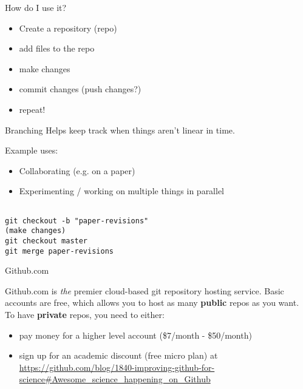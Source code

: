 \documentclass{beamer}
\begin{document}
\begin{frame}{How do I use it?}
  \begin{itemize}
  \item Create a repository (repo)
  \item add files to the repo
  \item make changes
  \item commit changes (push changes?)
  \item repeat!
  \end{itemize}

\end{frame}

\begin{frame}[fragile]
    \begin{block}{Branching}
        Helps keep track when things aren't linear in time.

        Example uses:
        \begin{itemize}
            \item Collaborating (e.g. on a paper)
            \item Experimenting / working on multiple things in parallel
        \end{itemize}

        \begin{verbatim}

git checkout -b "paper-revisions"
(make changes)
git checkout master
git merge paper-revisions

        \end{verbatim}
    \end{block}
\end{frame}

\begin{frame}{Github.com}

  Github.com is \textit{the} premier cloud-based git repository hosting
  service. Basic accounts are free, which allows you to host as many
  \textbf{public} repos as you want. To have \textbf{private} repos,
  you need to either:
  \begin{itemize}
  \item pay money for a higher level account (\$7/month - \$50/month)
  \item sign up for an academic discount (free micro plan) at \url{https://github.com/blog/1840-improving-github-for-science#Awesome_science_happening_on_Github}
  \end{itemize}


\end{frame}
\end{document}
